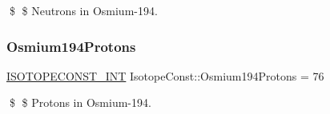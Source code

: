 \$ \$ Neutrons in Osmium-\/194. \mbox{\label{group___isotope_const-_osmium-_os194_ga0caaaa3f8a9fb83811f8bc88960fba90}} 
\subsubsection{\texorpdfstring{Osmium194\+Protons}{Osmium194Protons}}
{\footnotesize\ttfamily \mbox{\hyperlink{group___isotope_const-_macros_ga5f18360b3e99483a35c32d789e62621c}{I\+S\+O\+T\+O\+P\+E\+C\+O\+N\+S\+T\+\_\+\+I\+NT}} Isotope\+Const\+::\+Osmium194\+Protons = 76}

\$ \$ Protons in Osmium-\/194. 